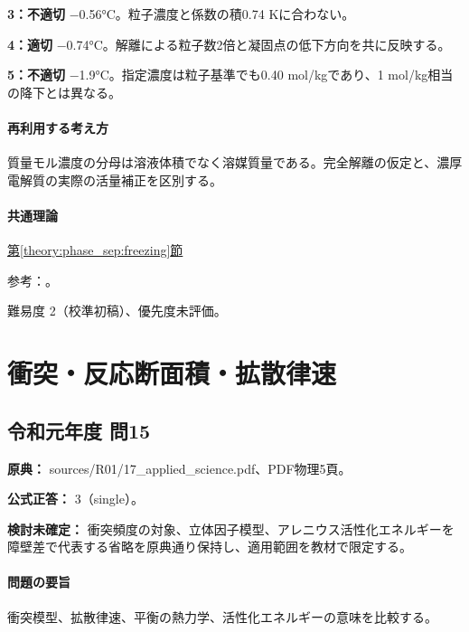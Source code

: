 \noindent\textbf{3：不適切} −0.56°C。粒子濃度と係数の積0.74 Kに合わない。\par

\noindent\textbf{4：適切} −0.74°C。解離による粒子数2倍と凝固点の低下方向を共に反映する。\par

\noindent\textbf{5：不適切} −1.9°C。指定濃度は粒子基準でも0.40 mol/kgであり、1 mol/kg相当の降下とは異なる。\par

\paragraph{再利用する考え方} 質量モル濃度の分母は溶液体積でなく溶媒質量である。完全解離の仮定と、濃厚電解質の実際の活量補正を区別する。

\paragraph{共通理論} \hyperref[theory:phase_sep:freezing]{第\ref*{theory:phase_sep:freezing}節}

\par 参考：\cite{mit_colligative2008}。

\par 難易度 2（校準初稿）、優先度未評価。

\section{衝突・反応断面積・拡散律速}

\subsection{令和元年度 問15}
\label{q:r01-reg-applied-15}

\noindent\textbf{原典：} sources/R01/17\_applied\_science.pdf、PDF物理5頁。

\textbf{公式正答：} 3（single）。

\par\textbf{検討未確定：} 衝突頻度の対象、立体因子模型、アレニウス活性化エネルギーを障壁差で代表する省略を原典通り保持し、適用範囲を教材で限定する。

\paragraph{問題の要旨} 衝突模型、拡散律速、平衡の熱力学、活性化エネルギーの意味を比較する。


